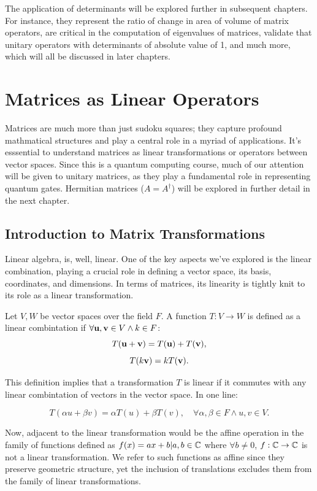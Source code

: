 \documentclass[12pt]{article}
\begin{document}
The application of determinants will be explored further in subsequent chapters. For instance, they represent the ratio of change in area of volume of matrix operators, are critical in the computation of eigenvalues of matrices, validate that unitary operators with determinants of absolute value of 1, and much more, which will all be discussed in later chapters. 

\break

\section{Matrices as Linear Operators}

Matrices are much more than just sudoku squares; they capture profound mathmatical structures and play a central role in a myriad of applications. It's esssential to understand matrices as linear transformations or operators between vector spaces. Since this is a quantum computing course, much of our attention will be given to unitary matrices, as they play a fundamental role in representing quantum gates. Hermitian matrices ($A = A^\dagger$) will be explored in further detail in the next chapter. 

\subsection{Introduction to Matrix Transformations}

Linear algebra, is, well, linear. One of the key aspects we've explored is the linear combination, playing a crucial role in defining a vector space, its basis, coordinates, and dimensions. In terms of matrices, its linearity is tightly knit to its role as a linear transformation. 

\begin{definition}
    Let $V, W$ be vector spaces over the field $F$. A function $T: V \rightarrow W$ is defined as a linear combintation if $\forall \mathbf{u}, \mathbf{v} \in V \land k \in F$:
    $$T(\mathbf{u} + \mathbf{v}) = T(\mathbf{u}) + T(\mathbf{v}),$$
    $$T(k \mathbf{v}) = k T(\mathbf{v}).$$
\end{definition}

This definition implies that a transformation $T$ is linear if it commutes with any linear combintation of vectors in the vector space. In one line: 

\[
T(\alpha u + \beta v) = \alpha T(u) + \beta T(v), \quad \forall \alpha, \beta \in F \land  u, v \in V.
\]

Now, adjacent to the linear transformation would be the affine operation in the family of functions defined as $f(x) = ax + b | a, b \in \mathbb{C}$ where $\forall b \neq 0$, $f: \mathbb{C} \rightarrow \mathbb{C}$ is not a linear transformation. We refer to such functions as affine since they preserve geometric structure, yet the inclusion of translations excludes them from the family of linear transformations. 
\end{document}
